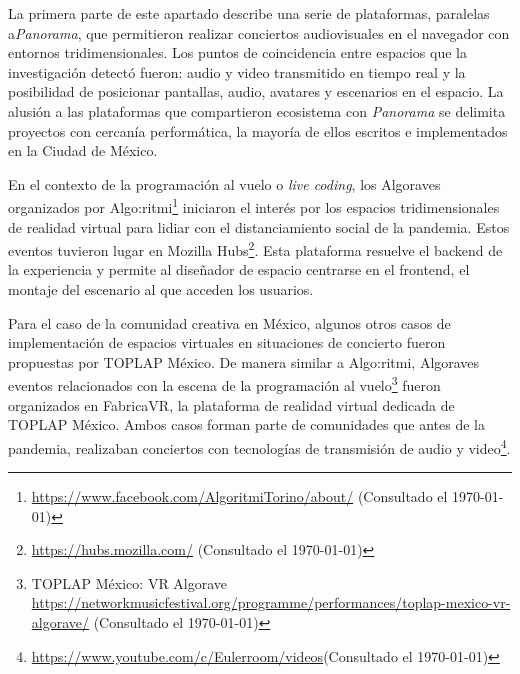 



La primera parte de este apartado describe una serie de plataformas, paralelas a\textit{Panorama}, que permitieron realizar conciertos audiovisuales en el navegador con entornos tridimensionales. Los puntos de coincidencia entre espacios que la investigación detectó fueron: audio y video transmitido en tiempo real y la posibilidad de posicionar pantallas, audio, avatares y escenarios en el espacio. La alusión a las plataformas que compartieron ecosistema con \textit{Panorama} se delimita proyectos con cercanía performática, la mayoría de ellos escritos e implementados en la Ciudad de México. 

En el contexto de la programación al vuelo o \textit{live coding}, los Algoraves organizados por Algo:ritmi\footnote{\url{https://www.facebook.com/AlgoritmiTorino/about/} (Consultado el \today)} iniciaron el interés por los espacios tridimensionales de realidad virtual para lidiar con el distanciamiento social de la pandemia. Estos eventos tuvieron lugar en Mozilla Hubs\footnote{\url{https://hubs.mozilla.com/} (Consultado el \today)}. Esta plataforma resuelve el backend de la experiencia y permite al diseñador de espacio centrarse en el frontend, el montaje del escenario al que acceden los usuarios.


Para el caso de la comunidad creativa en México, algunos otros casos de implementación de espacios virtuales en situaciones de concierto fueron propuestas por TOPLAP México. De manera similar a Algo:ritmi, Algoraves eventos relacionados con la escena de la programación al vuelo\footnote{TOPLAP México: VR Algorave \url{https://networkmusicfestival.org/programme/performances/toplap-mexico-vr-algorave/} (Consultado el \today)} fueron organizados en FabricaVR, la plataforma de realidad virtual dedicada de TOPLAP México. Ambos casos forman parte de comunidades que antes de la pandemia, realizaban conciertos con tecnologías de transmisión de audio y video\footnote{\url{https://www.youtube.com/c/Eulerroom/videos}(Consultado el \today)}.%

